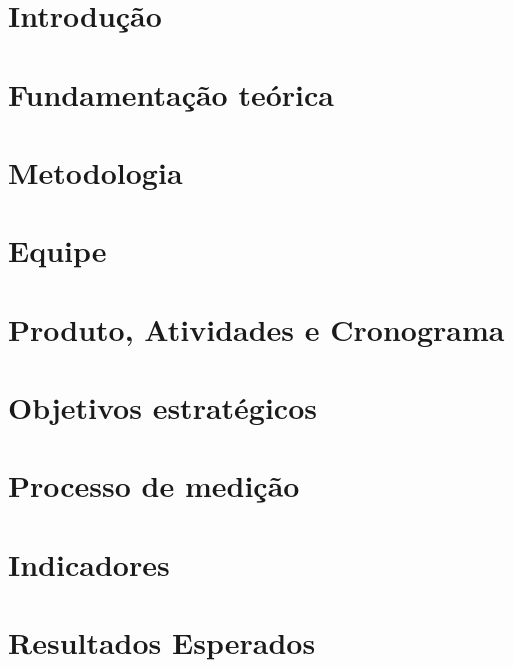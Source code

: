 
\section{Introdução} %
\label{sec:introducao}


\section{Fundamentação teórica}
\label{sec:fundamentacao_teorica}


\section{Metodologia}
\label{sec:metodologia}


\section{Equipe}
\label{sec:equipe}


\section{Produto, Atividades e Cronograma}
\label{sec:produto_atividade_cronograma}


\section{Objetivos estratégicos}
\label{sec:objetivos_estrategicos}


\section{Processo de medição}
\label{sec:processo_medicao}


  \section{Indicadores}
  \label{sec:indicadores}
  

\section{Resultados Esperados}
\label{sec:resultados_esperados}

